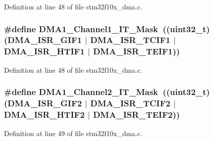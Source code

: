 Definition at line 48 of file stm32f10x\+\_\+dma.\+c.

\subsubsection[{\texorpdfstring{D\+M\+A1\+\_\+\+Channel1\+\_\+\+I\+T\+\_\+\+Mask}{DMA1_Channel1_IT_Mask}}]{\setlength{\rightskip}{0pt plus 5cm}\#define D\+M\+A1\+\_\+\+Channel1\+\_\+\+I\+T\+\_\+\+Mask~(({\bf uint32\+\_\+t})({\bf D\+M\+A\+\_\+\+I\+S\+R\+\_\+\+G\+I\+F1} $\vert$ {\bf D\+M\+A\+\_\+\+I\+S\+R\+\_\+\+T\+C\+I\+F1} $\vert$ {\bf D\+M\+A\+\_\+\+I\+S\+R\+\_\+\+H\+T\+I\+F1} $\vert$ {\bf D\+M\+A\+\_\+\+I\+S\+R\+\_\+\+T\+E\+I\+F1}))}\hypertarget{group___d_m_a___private___defines_ga76177263f2b9878765606f3bb8b9cc64}{}\label{group___d_m_a___private___defines_ga76177263f2b9878765606f3bb8b9cc64}


Definition at line 48 of file stm32f10x\+\_\+dma.\+c.

\subsubsection[{\texorpdfstring{D\+M\+A1\+\_\+\+Channel2\+\_\+\+I\+T\+\_\+\+Mask}{DMA1_Channel2_IT_Mask}}]{\setlength{\rightskip}{0pt plus 5cm}\#define D\+M\+A1\+\_\+\+Channel2\+\_\+\+I\+T\+\_\+\+Mask~(({\bf uint32\+\_\+t})({\bf D\+M\+A\+\_\+\+I\+S\+R\+\_\+\+G\+I\+F2} $\vert$ {\bf D\+M\+A\+\_\+\+I\+S\+R\+\_\+\+T\+C\+I\+F2} $\vert$ {\bf D\+M\+A\+\_\+\+I\+S\+R\+\_\+\+H\+T\+I\+F2} $\vert$ {\bf D\+M\+A\+\_\+\+I\+S\+R\+\_\+\+T\+E\+I\+F2}))}\hypertarget{group___d_m_a___private___defines_ga255d8869e69919c3b5c434088239ae8c}{}\label{group___d_m_a___private___defines_ga255d8869e69919c3b5c434088239ae8c}


Definition at line 49 of file stm32f10x\+\_\+dma.\+c.


